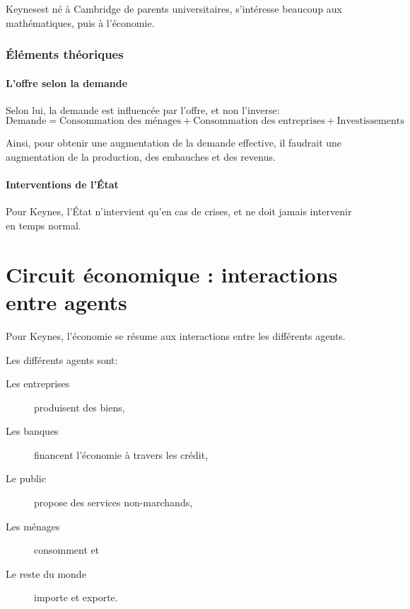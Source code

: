 \documentclass[10pt,a4paper,french]{article}
\begin{document}
Keynesest né à Cambridge de parents universitaires, s’intéresse beaucoup aux mathématiques, puis à l’économie.

\subsubsection{Éléments théoriques}

\paragraph{L'offre selon la demande}
Selon lui, la demande est influencée par l'offre, et non l'inverse:
\[ \text{Demande} = \text{Consommation des ménages} + \text{Consommation des entreprises} + \text{Investissements} \]

Ainsi, pour obtenir une augmentation de la demande effective, il faudrait une augmentation de la production, des embauches et des revenus.

\paragraph{Interventions de l'État}
Pour Keynes, l'État n'intervient qu'en cas de crises, et ne doit jamais intervenir en temps normal.

\section{Circuit économique : interactions entre agents}

Pour Keynes, l'économie se résume aux interactions entre les différents agents.

Les différents agents sont:
\begin{description}
\item[Les entreprises] produisent des biens,
\item[Les banques] financent l'économie à travers les crédit,
\item[Le public] propose des services non-marchands,
\item[Les ménages] consomment et
\item[Le reste du monde] importe et exporte.
\end{description}

\appendix %
\printindex
\end{document}

